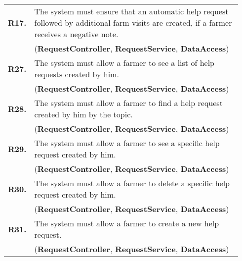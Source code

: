 \begin{longtable}{p{0.06\linewidth} p{0.88\linewidth}}
    \textbf{R17.} & The system must ensure that an automatic help request followed by additional farm visits are created, if a farmer receives a negative note.\\
    & (\textbf{RequestController}, \textbf{RequestService}, \textbf{DataAccess})\\
	
	\textbf{R27.} & The system must allow a farmer to see a list of help requests created by him.\\
	& (\textbf{RequestController}, \textbf{RequestService}, \textbf{DataAccess})\\
	\textbf{R28.} & The system must allow a farmer to find a help request created by him by the topic.\\
	& (\textbf{RequestController}, \textbf{RequestService}, \textbf{DataAccess})\\
	\textbf{R29.} & The system must allow a farmer to see a specific help request created by him.\\
	& (\textbf{RequestController}, \textbf{RequestService}, \textbf{DataAccess})\\
	\textbf{R30.} & The system must allow a farmer to delete a specific help request created by him.\\
	& (\textbf{RequestController}, \textbf{RequestService}, \textbf{DataAccess})\\
	\textbf{R31.} & The system must allow a farmer to create a new help request.\\
	& (\textbf{RequestController}, \textbf{RequestService}, \textbf{DataAccess})\\
	

\end{longtable}
